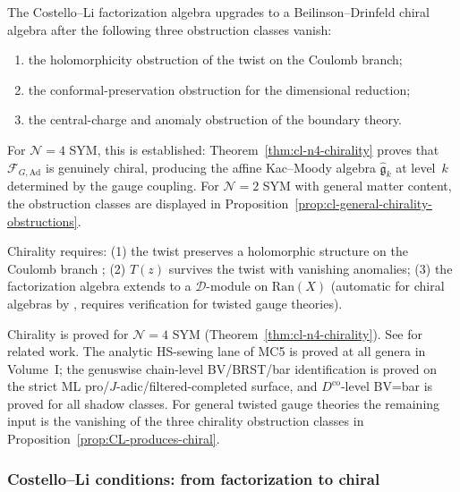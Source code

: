 \begin{proposition}\label{prop:CL-produces-chiral}
The Costello--Li factorization algebra upgrades to a Beilinson--Drinfeld
chiral algebra after the following three obstruction classes vanish:
\begin{enumerate}
\item the holomorphicity obstruction of the twist on the Coulomb branch;
\item the conformal-preservation obstruction for the dimensional reduction;
\item the central-charge and anomaly obstruction of the boundary theory.
\end{enumerate}

For $\mathcal{N}=4$ SYM, this is established:
Theorem~\ref{thm:cl-n4-chirality} proves that
$\mathcal{F}_{G,\mathrm{Ad}}$ is genuinely chiral, producing the
affine Kac--Moody algebra $\widehat{\mathfrak{g}}_k$ at level~$k$
determined by the gauge coupling. For $\mathcal{N}=2$ SYM with
general matter content, the obstruction classes are displayed in
Proposition~\ref{prop:cl-general-chirality-obstructions}.
\end{proposition}

\begin{remark}
Chirality requires: (1) the twist preserves a holomorphic structure on the Coulomb branch \cite{Gai19}; (2) $T(z)$ survives the twist with vanishing anomalies; (3) the factorization algebra extends to a $\mathcal{D}$-module on $\mathrm{Ran}(X)$ (automatic for chiral algebras by , requires verification for twisted gauge theories).
\end{remark}

\begin{remark}
Chirality is proved for $\mathcal{N}=4$ SYM (Theorem~\ref{thm:cl-n4-chirality}). See \cite{CDG20,GKW24,Zeng23} for related work. The analytic HS-sewing lane of MC5 is proved at all genera in Volume~I; the genuswise chain-level BV/BRST/bar identification is proved on the strict ML pro/$J$-adic/filtered-completed surface, and $D^{\mathrm{co}}$-level BV=bar is proved for all shadow classes. For general twisted gauge theories the remaining input is the vanishing of the three chirality obstruction classes in Proposition~\ref{prop:CL-produces-chiral}.
\end{remark}

\subsubsection{Costello--Li conditions: from factorization to chiral}

